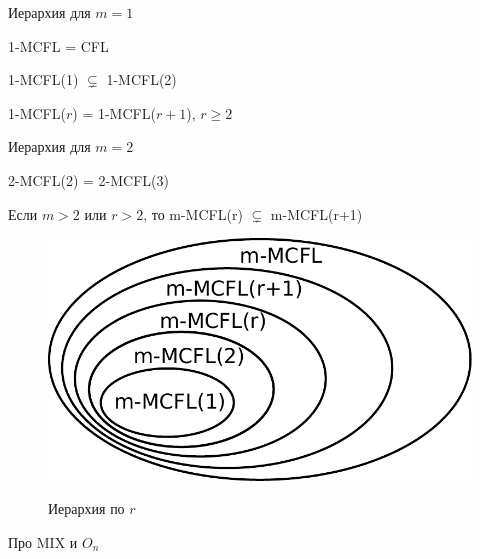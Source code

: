   Иерархия для $m=1$
 \begin{theorem}
  1-MCFL = CFL
 \end{theorem}

 \begin{theorem}
  1-MCFL(1) $\varsubsetneq$ 1-MCFL(2)
 \end{theorem}
 
 \begin{theorem}
  1-MCFL($r$) = 1-MCFL($r+1$), $r\geq2$
 \end{theorem}

 Иерархия для $m=2$
 \begin{theorem}
  2-MCFL(2) = 2-MCFL(3)
 \end{theorem}

 \begin{theorem}
 Если $m>2$ или $r>2$, то m-MCFL(r) $\varsubsetneq$ m-MCFL(r+1)
 \end{theorem}

\begin{figure}
    \includegraphics[width=\textwidth]{figures/mcfg/mcfg_2.pdf}
    \label{fig:mcfg_hierarachy_2}    
    \caption{Иерархия по $r$}
\end{figure}  


Про MIX и $O_n$

